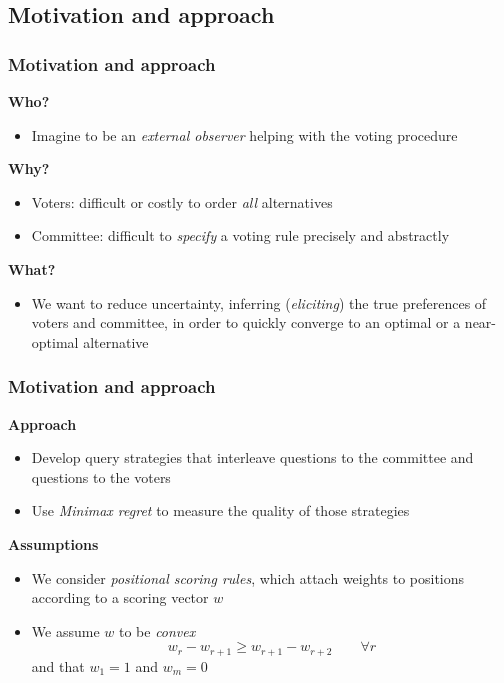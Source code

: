\documentclass{beamer}
\begin{document}
\subsection{Motivation and approach}
\begin{frame}
	\frametitle{Motivation and approach}
	\textbf{Who?}
	\begin{itemize}
		\item Imagine to be an \emph{external observer} helping with the voting procedure
	\end{itemize}
	 \textbf{Why?}
	\begin{itemize}
		\item Voters: difficult or costly to order \emph{all} alternatives
		\item Committee: difficult to \emph{specify} a voting rule precisely and abstractly
	\end{itemize}
	 \textbf{What?}
	\begin{itemize}
		\item We want to reduce uncertainty, inferring (\textit{eliciting}) the true preferences of voters and committee, in order to quickly converge to an optimal
		or a near-optimal alternative
	\end{itemize}		
\end{frame}

\begin{frame}
	\frametitle{Motivation and approach}
	 \textbf{Approach}
	\begin{itemize}
		\item Develop query strategies that interleave questions to the committee and questions to the voters
		\item Use \emph{Minimax regret} to measure the quality of those strategies
	\end{itemize}
	 \textbf{Assumptions}
	\begin{itemize}
		\item We consider \textit{positional scoring rules}, which attach weights to positions according to a scoring vector $w$
		\item We assume $w$ to be \textit{convex}
		\[ w_r - w_{r+1} \geq w_{r+1}-w_{r+2} \qquad \forall r\]
		and that $w_1=1$ and $w_m=0$
	\end{itemize}	
\end{frame}
\end{document}
